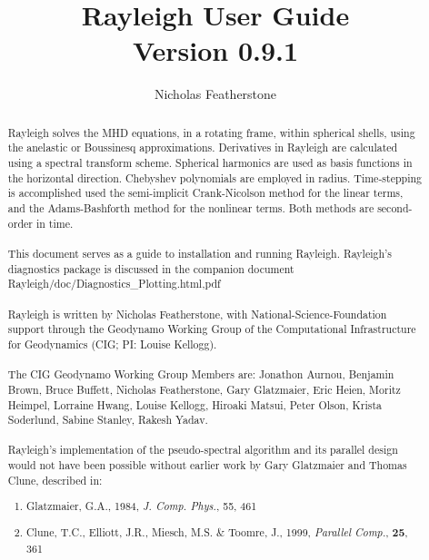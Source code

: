 \documentclass[10pt, letterpaper]{article}
\begin{document}
\title{Rayleigh User Guide \\ Version 0.9.1}
\author{Nicholas Featherstone}

\maketitle

\begin{abstract}

Rayleigh solves the MHD equations, in a rotating frame, within spherical shells, using the anelastic or Boussinesq approximations.  Derivatives in Rayleigh are calculated using a spectral transform scheme.  Spherical harmonics are used as basis functions in the horizontal direction.  Chebyshev polynomials are employed in radius.  Time-stepping is accomplished used the semi-implicit Crank-Nicolson method for the linear terms, and the Adams-Bashforth method for the nonlinear terms.  Both methods are second-order in time.
\\
\\
This document serves as a guide to installation and running Rayleigh.   Rayleigh's diagnostics package is discussed in the companion document Rayleigh/doc/Diagnostics\_Plotting.{html,pdf}
\\
\\
Rayleigh is written by Nicholas Featherstone, with National-Science-Foundation support through the Geodynamo Working Group of the Computational Infrastructure for Geodynamics (CIG; PI: Louise Kellogg).
\\
\\
The CIG Geodynamo Working Group Members are:
Jonathon Aurnou, Benjamin Brown, Bruce Buffett, Nicholas Featherstone, Gary Glatzmaier, Eric Heien, Moritz Heimpel, Lorraine Hwang, Louise Kellogg, Hiroaki Matsui, Peter Olson, Krista Soderlund, Sabine Stanley, Rakesh Yadav.
\\
\\
\noindent Rayleigh's implementation of the pseudo-spectral algorithm and its parallel design would not have been possible without earlier work by Gary Glatzmaier and Thomas Clune, described in:
\begin{enumerate}
\item Glatzmaier, G.A., 1984, \textit{J. Comp. Phys.}, 55, 461
\item Clune, T.C., Elliott, J.R., Miesch, M.S. \& Toomre, J., 1999, \textit{Parallel Comp.}, \textbf{25}, 361
\end{enumerate}

\end{abstract}
\clearpage
\end{document}
